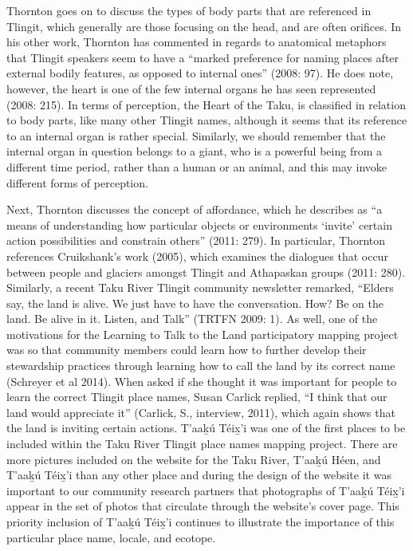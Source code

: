 Thornton goes on to discuss the types of body parts that are referenced in Tlingit, which generally are those focusing on the head, and are often orifices. In his other work, Thornton has commented in regards to anatomical metaphors that Tlingit speakers seem to have a “marked preference for naming places after external bodily features, as opposed to internal ones” (2008: 97). He does note, however, the heart is one of the few internal organs he has seen represented (2008: 215). In terms of perception, the Heart of the Taku, is classified in relation to body parts, like many other Tlingit names, although it seems that its reference to an internal organ is rather special. Similarly, we should remember that the internal organ in question belongs to a giant, who is a powerful being from a different time period, rather than a human or an animal, and this may invoke different forms of perception.

Next, Thornton discusses the concept of affordance, which he describes as “a means of understanding how particular objects or environments ‘invite’ certain action possibilities and constrain others” (2011: 279). In particular, Thornton references Cruikshank’s work (2005), which examines the dialogues that occur between people and glaciers amongst Tlingit and Athapaskan groups (2011: 280). Similarly, a recent Taku River Tlingit community newsletter remarked, “Elders say, the land is alive. We just have to have the conversation. How? Be on the land. Be alive in it. Listen, and Talk” (TRTFN 2009: 1). As well, one of the motivations for the Learning to Talk to the Land participatory mapping project was so that community members could learn how to further develop their stewardship practices through learning how to call the land by its correct name (Schreyer et al 2014). When asked if she thought it was important for people to learn the correct Tlingit place names, Susan Carlick replied, “I think that our land would appreciate it” (Carlick, S., interview, 2011), which again shows that the land is inviting certain actions. T'aak̲ú Téix̲'i was one of the first places to be included within the Taku River Tlingit place names mapping project. There are more pictures included on the website for the Taku River, T'aak̲ú Héen, and T'aak̲ú Téix̲'i than any other place and during the design of the website it was important to our community research partners that photographs of T'aak̲ú Téix̲'i appear in the set of photos that circulate through the website’s cover page. This priority inclusion of T'aak̲ú Téix̲'i continues to illustrate the importance of this particular place name, locale, and ecotope.

